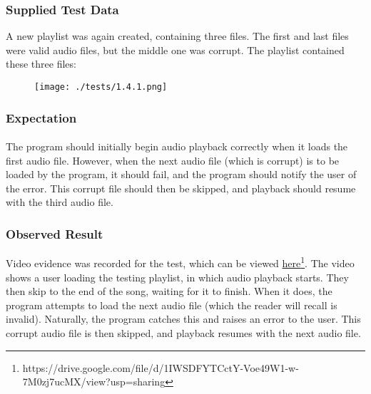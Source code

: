 \paragraph{}
{
	\centering
}

\subsubsection{Supplied Test Data}
A new playlist was again created, containing three files. The first and last files were valid audio files, but the middle one was corrupt. The playlist contained these three files:
\begin{figure}[H]
	\texttt{[image: ./tests/1.4.1.png]}
\end{figure}

\subsubsection{Expectation}
\paragraph{}
The program should initially begin audio playback correctly when it loads the first audio file. However, when the next audio file (which is corrupt) is to be loaded by the program, it should fail, and the program should notify the user of the error. This corrupt file should then be skipped, and playback should resume with the third audio file.
 
\subsubsection{Observed Result}
Video evidence was recorded for the test, which can be viewed \href{https://drive.google.com/file/d/1IWSDFYTCctY-Voe49W1-w-7M0zj7ucMX/view?usp=sharing}{here}\footnote{
	https://drive.google.com/file/d/1IWSDFYTCctY-Voe49W1-w-7M0zj7ucMX/view?usp=sharing
}.  The video shows a user loading the testing playlist, in which audio playback starts. They then skip to the end of the song, waiting for it to finish. When it does, the program attempts to load the next audio file (which the reader will recall is invalid). Naturally, the program catches this and raises an error to the user. This corrupt audio file is then skipped, and playback resumes with the next audio file.

